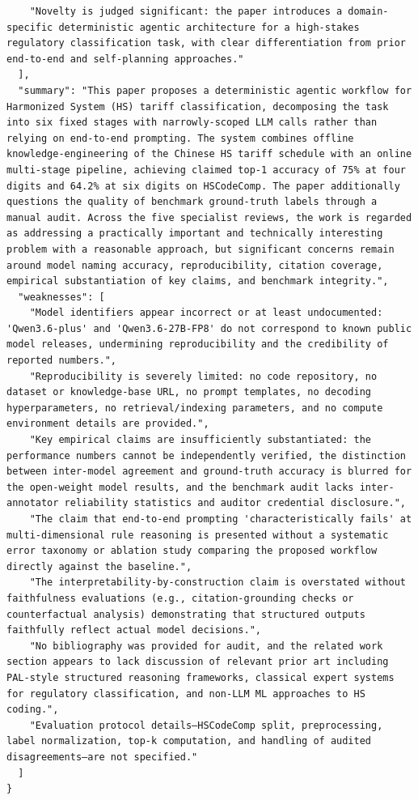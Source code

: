 \documentclass[11pt]{article}
\begin{document}
\begin{verbatim}
    "Novelty is judged significant: the paper introduces a domain-specific deterministic agentic architecture for a high-stakes regulatory classification task, with clear differentiation from prior end-to-end and self-planning approaches."
  ],
  "summary": "This paper proposes a deterministic agentic workflow for Harmonized System (HS) tariff classification, decomposing the task into six fixed stages with narrowly-scoped LLM calls rather than relying on end-to-end prompting. The system combines offline knowledge-engineering of the Chinese HS tariff schedule with an online multi-stage pipeline, achieving claimed top-1 accuracy of 75% at four digits and 64.2% at six digits on HSCodeComp. The paper additionally questions the quality of benchmark ground-truth labels through a manual audit. Across the five specialist reviews, the work is regarded as addressing a practically important and technically interesting problem with a reasonable approach, but significant concerns remain around model naming accuracy, reproducibility, citation coverage, empirical substantiation of key claims, and benchmark integrity.",
  "weaknesses": [
    "Model identifiers appear incorrect or at least undocumented: 'Qwen3.6-plus' and 'Qwen3.6-27B-FP8' do not correspond to known public model releases, undermining reproducibility and the credibility of reported numbers.",
    "Reproducibility is severely limited: no code repository, no dataset or knowledge-base URL, no prompt templates, no decoding hyperparameters, no retrieval/indexing parameters, and no compute environment details are provided.",
    "Key empirical claims are insufficiently substantiated: the performance numbers cannot be independently verified, the distinction between inter-model agreement and ground-truth accuracy is blurred for the open-weight model results, and the benchmark audit lacks inter-annotator reliability statistics and auditor credential disclosure.",
    "The claim that end-to-end prompting 'characteristically fails' at multi-dimensional rule reasoning is presented without a systematic error taxonomy or ablation study comparing the proposed workflow directly against the baseline.",
    "The interpretability-by-construction claim is overstated without faithfulness evaluations (e.g., citation-grounding checks or counterfactual analysis) demonstrating that structured outputs faithfully reflect actual model decisions.",
    "No bibliography was provided for audit, and the related work section appears to lack discussion of relevant prior art including PAL-style structured reasoning frameworks, classical expert systems for regulatory classification, and non-LLM ML approaches to HS coding.",
    "Evaluation protocol details—HSCodeComp split, preprocessing, label normalization, top-k computation, and handling of audited disagreements—are not specified."
  ]
}
\end{verbatim}
\end{document}
